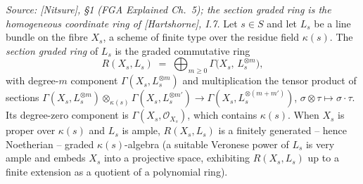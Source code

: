 \begin{definition}
  \label{def:sectionGradedRing}
  \textit{Source: [Nitsure], \S 1 (FGA Explained Ch.~5); the section graded
  ring is the homogeneous coordinate ring of [Hartshorne], I.7.}
  Let \(s \in S\) and let \(L_s\) be a line bundle on the fibre \(X_s\), a scheme
  of finite type over the residue field \(\kappa(s)\). The \emph{section graded
  ring} of \(L_s\) is the graded commutative ring
  \[
    R(X_s, L_s) \;=\; \bigoplus_{m \ge 0} \Gamma\bigl(X_s,\, L_s^{\otimes m}\bigr),
  \]
  with degree-\(m\) component \(\Gamma(X_s, L_s^{\otimes m})\) and multiplication
  the tensor product of sections
  \(\Gamma(X_s, L_s^{\otimes m}) \otimes_{\kappa(s)}
  \Gamma(X_s, L_s^{\otimes m'}) \to \Gamma(X_s, L_s^{\otimes (m+m')})\),
  \(\sigma \otimes \tau \mapsto \sigma \cdot \tau\). Its degree-zero component is
  \(\Gamma(X_s, \mathcal{O}_{X_s})\), which contains \(\kappa(s)\). When \(X_s\) is
  proper over \(\kappa(s)\) and \(L_s\) is ample, \(R(X_s, L_s)\) is a finitely
  generated -- hence Noetherian -- graded \(\kappa(s)\)-algebra (a suitable
  Veronese power of \(L_s\) is very ample and embeds \(X_s\) into a projective
  space, exhibiting \(R(X_s, L_s)\) up to a finite extension as a quotient of a
  polynomial ring).
\end{definition}

